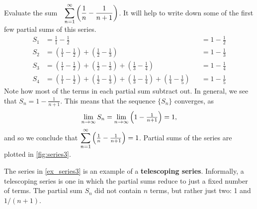 \begin{example}\label{ex_series3}%
Evaluate the sum~~$\displaystyle \sum_{n=1}^\infty \left(\frac1n-\frac1{n+1}\right)$.
\solution
It will help to write down some of the first few partial sums of this series.
\begin{align*}
S_1 &=	\frac11-\frac12 & & = 1-\frac12\\
S_2 &=	\left(\frac11-\frac12\right) + \left(\frac12-\frac13\right) & & = 1-\frac13\\
S_3 &=	\left(\frac11-\frac12\right) + \left(\frac12-\frac13\right)+\left(\frac13-\frac14\right) & &= 1-\frac14\\
S_4 &=	\left(\frac11-\frac12\right) + \left(\frac12-\frac13\right)+\left(\frac13-\frac14\right) +\left(\frac14-\frac15\right)& &= 1-\frac15
\end{align*}
Note how most of the terms in each partial sum subtract out. In general, we see that $S_n = 1-\frac{1}{n+1}$. This means that the sequence $\{S_n\}$ converges,  as
\[\lim_{n\to\infty}S_n=\smallskip\lim_{n\to\infty}\left(1-\tfrac1{n+1}\right)=1,\]
and so we conclude that $\displaystyle\sum_{n=1}^\infty \left(\tfrac1n-\tfrac1{n+1}\right) = 1$. Partial sums of the series are plotted in \autoref{fig:series3}.
\end{example}

%

The series in \autoref{ex_series3} is an example of a \textbf{telescoping series}. Informally, a telescoping series is one in which the partial sums reduce to just a fixed number of terms. The partial sum $S_n$ did not contain $n$ terms, but rather just two: 1 and $1/(n+1)$.

